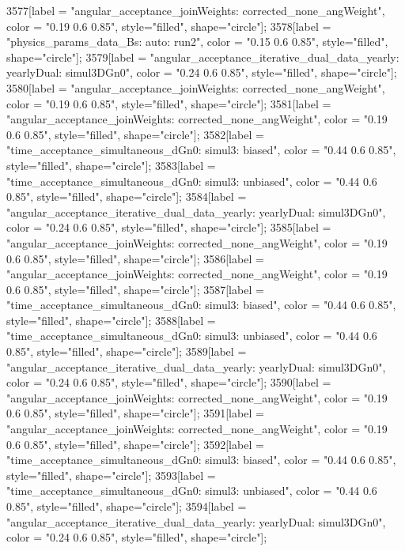 {	3577[label = "angular_acceptance_joinWeights\nwflag: corrected_none_angWeight", color = "0.19 0.6 0.85", style="filled", shape="circle"];
	3578[label = "physics_params_data_Bs\nfit: auto\nyear: run2", color = "0.15 0.6 0.85", style="filled", shape="circle"];
	3579[label = "angular_acceptance_iterative_dual_data_yearly\nangacc: yearlyDual\ntimeacc: simul3DGn0", color = "0.24 0.6 0.85", style="filled", shape="circle"];
	3580[label = "angular_acceptance_joinWeights\nwflag: corrected_none_angWeight", color = "0.19 0.6 0.85", style="filled", shape="circle"];
	3581[label = "angular_acceptance_joinWeights\nwflag: corrected_none_angWeight", color = "0.19 0.6 0.85", style="filled", shape="circle"];
	3582[label = "time_acceptance_simultaneous_dGn0\ntimeacc: simul3\ntrigger: biased", color = "0.44 0.6 0.85", style="filled", shape="circle"];
	3583[label = "time_acceptance_simultaneous_dGn0\ntimeacc: simul3\ntrigger: unbiased", color = "0.44 0.6 0.85", style="filled", shape="circle"];
	3584[label = "angular_acceptance_iterative_dual_data_yearly\nangacc: yearlyDual\ntimeacc: simul3DGn0", color = "0.24 0.6 0.85", style="filled", shape="circle"];
	3585[label = "angular_acceptance_joinWeights\nwflag: corrected_none_angWeight", color = "0.19 0.6 0.85", style="filled", shape="circle"];
	3586[label = "angular_acceptance_joinWeights\nwflag: corrected_none_angWeight", color = "0.19 0.6 0.85", style="filled", shape="circle"];
	3587[label = "time_acceptance_simultaneous_dGn0\ntimeacc: simul3\ntrigger: biased", color = "0.44 0.6 0.85", style="filled", shape="circle"];
	3588[label = "time_acceptance_simultaneous_dGn0\ntimeacc: simul3\ntrigger: unbiased", color = "0.44 0.6 0.85", style="filled", shape="circle"];
	3589[label = "angular_acceptance_iterative_dual_data_yearly\nangacc: yearlyDual\ntimeacc: simul3DGn0", color = "0.24 0.6 0.85", style="filled", shape="circle"];
	3590[label = "angular_acceptance_joinWeights\nwflag: corrected_none_angWeight", color = "0.19 0.6 0.85", style="filled", shape="circle"];
	3591[label = "angular_acceptance_joinWeights\nwflag: corrected_none_angWeight", color = "0.19 0.6 0.85", style="filled", shape="circle"];
	3592[label = "time_acceptance_simultaneous_dGn0\ntimeacc: simul3\ntrigger: biased", color = "0.44 0.6 0.85", style="filled", shape="circle"];
	3593[label = "time_acceptance_simultaneous_dGn0\ntimeacc: simul3\ntrigger: unbiased", color = "0.44 0.6 0.85", style="filled", shape="circle"];
	3594[label = "angular_acceptance_iterative_dual_data_yearly\nangacc: yearlyDual\ntimeacc: simul3DGn0", color = "0.24 0.6 0.85", style="filled", shape="circle"];
}
